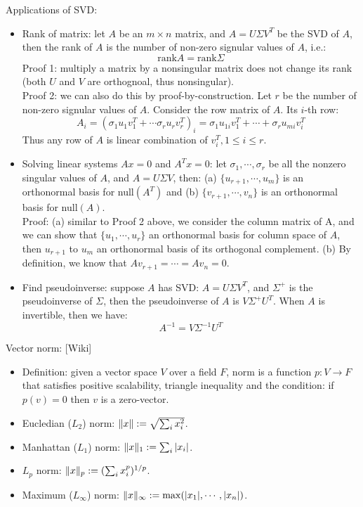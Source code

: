 \documentclass{report}
\begin{document}
Applications of SVD: 
\begin{itemize}
\item Rank of matrix: let $A$ be an $m \times n$ matrix, and $A = U \Sigma V^T$ be the SVD of $A$, then the rank of $A$ is the number of non-zero signular values of $A$, i.e.: 
\begin{equation}
\text{rank} A = \text{rank} \Sigma	
\end{equation}
Proof 1: multiply a matrix by a nonsingular matrix does not change its rank (both $U$ and $V$ are orthognoal, thus nonsingular). \\
Proof 2: we can also do this by proof-by-construction. Let $r$ be the number of non-zero signular values of $A$. Consider the row matrix of $A$. Its $i$-th row: 
\begin{equation}
A_i = (\sigma_1 u_1 v_1^T + \cdots \sigma_r u_r v_r^T)_i = \sigma_1 u_{1i} v_1^T + \cdots + \sigma_r u_{mi} v_i^T
\end{equation}
Thus any row of $A$ is linear combination of $v_i^T, 1 \leq i \leq r$. 

\item Solving linear systems $A x = 0$ and $A^T x = 0$: let $\sigma_1, \cdots, \sigma_r$ be all the nonzero singular values of $A$, and $A = U \Sigma V$, then: (a) $\{u_{r+1}, \cdots, u_m\}$ is an orthonormal basis for null$(A^T)$ and (b) $\{v_{r+1}, \cdots, v_n\}$ is an orthonormal basis for null$(A)$. \\
Proof: (a) similar to Proof 2 above, we consider the column matrix of A, and we can show that $\{u_1, \cdots, u_r\}$ an orthonormal basis for column space of $A$, then $u_{r+1}$ to $u_m$ an orthonormal basis of its orthogonal complement. (b) By definition, we know that $A v_{r+1} = \cdots = Av_n =0$.  

\item Find pseudoinverse: suppose $A$ has SVD: $A = U \Sigma V^T$, and $\Sigma^{+}$ is the pseudoinverse of $\Sigma$, then the pseudoinverse of $A$ is $V \Sigma^{+} U^T$. When $A$ is invertible, then we have: 
\begin{equation}
A^{-1} = V \Sigma^{-1} U^T	
\end{equation}
\end{itemize}

Vector norm: [Wiki]
\begin{itemize}
	\item Definition: given a vector space $V$ over a field $F$, norm is a function $p: V \rightarrow F$ that satisfies positive scalability, triangle inequality and the condition: if $p(v) = 0$ then $v$ is a zero-vector. 
	
	\item Eucledian ($L_2$) norm: $\lVert x\rVert := \sqrt{\sum_i x_i^2}$. 
	
	\item Manhattan ($L_1$) norm: $\lVert x\rVert_1 := \sum_i |x_i|$. 
	
	\item $L_p$ norm: $\lVert x\rVert_p := (\sum_i x_i^p)^{1/p}$.
	
	\item Maximum ($L_{\infty}$) norm: $\lVert x\rVert_{\infty} := \max(|x_1|, \cdots, |x_n|)$.
\end{itemize}
\end{document}
